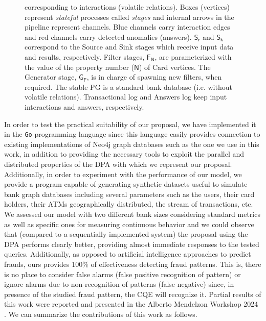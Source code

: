 {\begin{figure}[h]
{         corresponding to \textsf{interactions} (volatile relations). 
         Boxes (vertices) represent \emph{stateful} processes called \emph{stages} 
         and internal arrows in the pipeline represent channels. 
         Blue channels carry interaction edges and red channels carry detected anomalies (answers).  
         $\mathsf{S_r}$ and $\mathsf{S_k}$ correspond to the \textsf{Source} and \textsf{Sink} 
         stages which receive input data and results, respectively. 
         \textsf{Filter} stages, $\mathsf{F_{N}}$, are parameterized with the value of the property 
         \textsf{number} ($\mathsf{N}$) of \textsf{Card} vertices. 
         The \textsf{Generator} stage, $\mathsf{G_F}$, is in charge of spawning new filters, 
         when required. The stable PG is a standard bank database (i.e. without volatile relations). 
         Transactional log and Answers log keep input interactions and answers, respectively.
         }
         \label{fig:DP_ATM}
\end{figure}

In order to test the practical suitability of our proposal, 
we have implemented it in the \texttt{Go} programming 
language since this language easily provides connection 
to existing implementations of Neo4j graph databases 
such as the one we use in this work, in addition to providing the necessary 
tools to exploit the parallel 
and distributed properties of the DPA with which we represent our proposal.
Additionally, in order to experiment with the performance of our model, 
we provide a program capable of generating synthetic datasets useful 
to simulate bank graph databases including several parameters such as the users, 
their card holders, their ATMs geographically distributed, 
the stream of transactions, etc.\cite{ATM-DP-github}
We assessed our model with two different bank sizes considering standard metrics as well as specific ones \cite{exps-diefficiency} for measuring continuous behavior  
and we could observe that (compared to a sequentially implemented system) 
the proposal using the DPA performs clearly better, 
providing almost immediate responses to the tested queries. 
Additionally, as opposed to artificial intelligence approaches \cite{ahmed2016survey,} to predict frauds, 
ours provides 100\% of effectiveness detecting fraud patterns. 
This is, there is no place to consider false alarms (false positive recognition of pattern)  
or ignore alarms due to non-recognition of patterns (false negative) since,  
in presence of the studied fraud pattern, the CQE will recognize it. Partial results of this work were reported and presented in the Alberto Mendelzon Workshop 2024 \cite{martincanfran2024AMW}. 
We can summarize the contributions of this work as follows.

}
